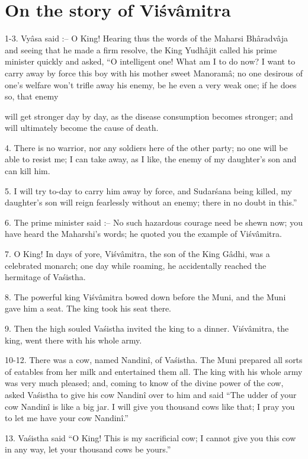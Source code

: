 ﻿\chapter{On the story of Vi\'sv\^amitra}

1-3. Vy\^asa said :-- O King! Hearing thus the words of the Maharsi Bh\^aradv\^aja and seeing that he made a firm resolve, the King Yudh\^ajit called his prime minister quickly and asked, ``O intelligent one! What am I to do now? I want to carry away by force this boy with his mother sweet Manoram\^a; no one desirous of one's welfare won't trifle away his enemy, be he even a very weak one; if he does so, that enemy

will get stronger day by day, as the disease consumption becomes stronger; and will ultimately become the cause of death.

4. There is no warrior, nor any soldiers here of the other party; no one will be able to resist me; I can take away, as I like, the enemy of my daughter's son and can kill him.

5. I will try to-day to carry him away by force, and Sudar\'sana being killed, my daughter's son will reign fearlessly without an enemy; there in no doubt in this.''

6. The prime minister said :-- No such hazardous courage need be shewn now; you have heard the Maharshi's words; he quoted you the example of Vi\'sv\^amitra.

7. O King! In days of yore, Vi\'sv\^amitra, the son of the King G\^adhi, was a celebrated monarch; one day while roaming, he accidentally reached the hermitage of Va\'sistha.

8. The powerful king Vi\'sv\^amitra bowed down before the Muni, and the Muni gave him a seat. The king took his seat there.

9. Then the high souled Va\'sistha invited the king to a dinner. Vi\'sv\^amitra, the king, went there with his whole army.

10-12. There was a cow, named Nandin\^i, of Va\'sistha. The Muni prepared all sorts of eatables from her milk and entertained them all. The king with his whole army was very much pleased; and, coming to know of the divine power of the cow, asked Va\'sistha to give his cow Nandin\^i over to him and said ``The udder of your cow Nandin\^i is like a big jar. I will give you thousand cows like that; I pray you to let me have your cow Nandin\^i.''

13. Va\'sistha said ``O King! This is my sacrificial cow; I cannot give you this cow in any way, let your thousand cows be yours.''


